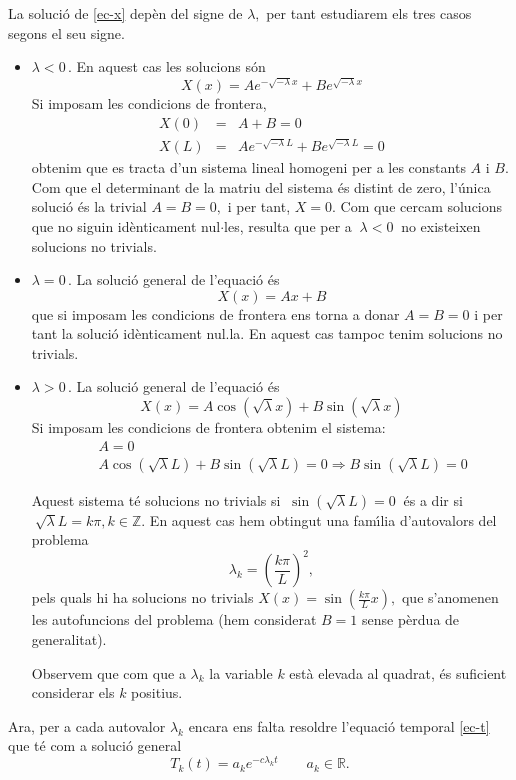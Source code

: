 \documentclass[12pt]{article}
\newcommand{\Z}{\mathbb{Z}}
\newcommand{\R}{\mathbb{R}}
\begin{document}
La soluci{\'o} de \eqref{ec-x} dep{\`e}n del signe de $\lambda,$ per tant estudiarem els tres casos segons el seu signe.
\begin{itemize}
\item $\lambda<0\,.$ En aquest cas les solucions s{\'o}n
\[
 X(x)=Ae^{-\sqrt{-\lambda}x}+Be^{\sqrt{-\lambda} x}
\]
Si imposam les condicions de frontera,
\begin{eqnarray*}
 X(0)&=&A+B=0\\
X(L)&=&Ae^{-\sqrt{-\lambda}L}+Be^{\sqrt{-\lambda} L}=0
\end{eqnarray*}
obtenim que es tracta d'un sistema lineal homogeni per a les constants $A$ i $B.$ Com que el determinant de la matriu
del sistema {\'e}s distint de zero, l'{\'u}nica soluci{\'o} {\'e}s la trivial $A = B = 0,$ i per tant, $X = 0.$
Com que cercam solucions que no siguin id{\`e}nticament nul$\cdot$les, resulta que per a $\ \lambda < 0\ $ no existeixen solucions no trivials.

\item $\lambda=0\,.$ La soluci{\'o} general de l'equaci{\'o} {\'e}s
\[
 X(x)=Ax+B
\]
que si imposam les condicions de frontera ens torna a donar $A=B=0$ i per tant la soluci{\'o} id{\`e}nticament nul.la.
En aquest cas tampoc tenim solucions no trivials.

\item $\lambda>0\,.$ La soluci{\'o} general de l'equaci{\'o} {\'e}s
\[
 X(x)=A\cos(\sqrt{\lambda}x)+B\sin(\sqrt{\lambda}x)
\]
Si imposam les condicions de frontera obtenim el sistema:
\begin{eqnarray*}
&& A=0\\
&&A\cos(\sqrt{\lambda} L)+B\sin(\sqrt{\lambda} L)=0\Rightarrow B\sin(\sqrt{\lambda} L)=0
\end{eqnarray*}

Aquest sistema t{\'e} solucions no trivials si $\ \sin(\sqrt{\lambda} L)=0\ $ {\'e}s a dir si $\ \sqrt{\lambda}L=k\pi, k\in\Z.$
En aquest cas hem obtingut una fam{\'\i}lia d'autovalors del pro\-ble\-ma
\[
 \lambda_k=\left(\frac{k\pi}{L}\right)^2,
\]
pels quals hi ha solucions no trivials
$
 X(x)=\sin\left(\frac{k\pi}{L} x\right),
$
que s'anomenen les autofuncions del pro\-ble\-ma (hem considerat $B = 1$ sense p{\`e}rdua de generalitat).

Observem que com que a $\lambda_k$ la variable $k$ est{\`a} elevada al quadrat, {\'e}s suficient considerar els $k$ positius.
\end{itemize}

Ara, per a cada autovalor $\lambda_k$ encara ens falta resoldre l'equaci{\'o} temporal \eqref{ec-t}
que t{\'e} com a soluci{\'o} general
\[
 T_k(t)=a_ke^{-c\lambda_k t}\qquad a_k\in\R.
\]
\end{document}
